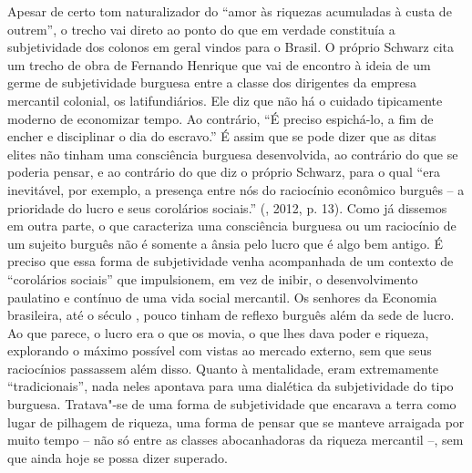 Apesar de certo tom naturalizador do ``amor às riquezas acumuladas à
custa de outrem'', o trecho vai direto ao ponto do que em verdade
constituía a subjetividade dos colonos em geral vindos para o Brasil. O
próprio Schwarz cita um trecho de obra de Fernando Henrique que vai de
encontro à ideia de um germe de subjetividade burguesa entre a classe
dos dirigentes da empresa mercantil colonial, os latifundiários. Ele diz
que não há o cuidado tipicamente moderno de economizar tempo. Ao
contrário, ``É preciso espichá-lo, a fim de encher e disciplinar o dia
do escravo.'' É assim que se pode dizer que as ditas elites não tinham
uma consciência burguesa desenvolvida, ao contrário do que se poderia
pensar, e ao contrário do que diz o próprio Schwarz, para o qual ``era
inevitável, por exemplo, a presença entre nós do raciocínio econômico
burguês -- a prioridade do lucro e seus corolários sociais.'' (,
2012, p. 13). Como já dissemos em outra parte, o que caracteriza uma
consciência burguesa ou um raciocínio de um sujeito burguês não é
somente a ânsia pelo lucro que é algo bem antigo. É preciso que essa
forma de subjetividade venha acompanhada de um contexto de ``corolários
sociais'' que impulsionem, em vez de inibir, o desenvolvimento paulatino
e contínuo de uma vida social mercantil. Os senhores da Economia
brasileira, até o século , pouco tinham de reflexo burguês além da
sede de lucro. Ao que parece, o lucro era o que os movia, o que lhes
dava poder e riqueza, explorando o máximo possível com vistas ao mercado
externo, sem que seus raciocínios passassem além disso. Quanto à
mentalidade, eram extremamente ``tradicionais'', nada neles apontava
para uma dialética da subjetividade do tipo burguesa. Tratava"-se de uma
forma de subjetividade que encarava a terra como lugar de pilhagem de
riqueza, uma forma de pensar que se manteve arraigada por muito tempo --
não só entre as classes abocanhadoras da riqueza mercantil --, sem que
ainda hoje se possa dizer superado.

